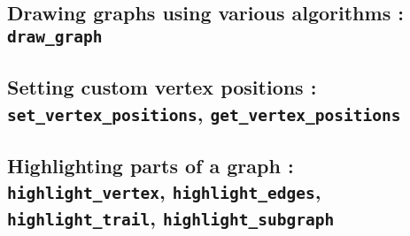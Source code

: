 \documentclass[a4paper,11pt]{article}
\begin{document}
\subsection{Drawing graphs using various algorithms : {\tt draw\_graph}}

\subsection{Setting custom vertex positions : {\tt set\_vertex\_positions}, {\tt get\_vertex\_positions}}

\subsection{Highlighting parts of a graph : {\tt highlight\_vertex}, {\tt highlight\_edges}, {\tt highlight\_trail}, {\tt highlight\_subgraph}}
\end{document}

